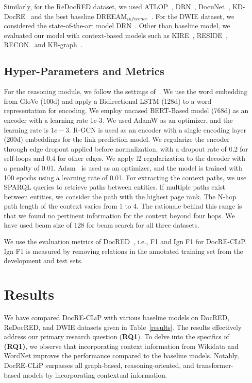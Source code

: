 \documentclass[letterpaper]{article} %
\begin{document}
Similarly, for the ReDocRED dataset, we used
ATLOP~\cite{DBLP:conf/aaai/Zhou0M021},
DRN~\cite{xu-etal-2021-discriminative},
DocuNet~\cite{ijcai2021p551},
KD-DocRE~\cite{tan-etal-2022-document} and the best baseline
DREEAM$_{inference}$~\cite{DBLP:conf/eacl/MaWO23}. For the DWIE dataset, we considered the state-of-the-art model
DRN~\cite{xu-etal-2021-discriminative}. Other than baseline model, we evaluated our model with context-based models such as KIRE~\cite{DBLP:conf/semweb/WangWSH22}, RESIDE~\cite{vashishth-etal-2018-reside}, RECON~\cite{DBLP:conf/www/BastosN0MSHK21} and KB-graph~\cite{DBLP:conf/acl/VerlindenZDDD21}.

\subsection{Hyper-Parameters and Metrics}
For the reasoning module, we follow the settings of~\cite{xu-etal-2021-discriminative}. We use the word embedding from GloVe (100d) and apply a Bidirectional LSTM (128d) to a word representation for encoding.
We employ uncased BERT-Based model (768d) as an encoder with a learning rate 1e-3. We used AdamW as an optimizer, and the learning rate is $1e-3$.
R-GCN is used as an encoder with a single encoding layer (200d) embeddings for the link prediction model. We regularize the encoder through edge dropout applied before normalization, with a dropout rate of 0.2 for self-loops and 0.4 for other edges. We apply l2 regularization to the decoder with a penalty of 0.01. Adam~\cite{DBLP:journals/corr/KingmaB14} is used as an optimizer, and the model is trained with 100 epochs using a learning rate of 0.01. For extracting the context paths, we use SPARQL queries to retrieve paths between entities. If multiple paths exist between entities, we consider the path with the highest page rank. The N-hop path length of the context varies from 1 to 4. The rationale behind this range is that we found no pertinent information for the context beyond four hops. We have used beam size of 128 for beam search for all three datasets.

We use the evaluation metrics of DocRED~\cite{yao-etal-2019-docred}, i.e., F1 and Ign F1 for DocRE-CLiP. Ign F1 is measured by removing relations in the annotated training set from the development and test sets.





\section{Results}
We have compared DocRE-CLiP with various baseline models on DocRED, ReDocRED, and DWIE datasets given in Table~\ref{results}. The results effectively address our primary research question (\textbf{RQ1}). To delve into the specifics of \textbf{(RQ1)}, we observe that incorporating context information from Wikidata and WordNet improves the performance compared to the baseline models. Notably, DocRE-CLiP surpasses all graph-based, reasoning-oriented, and transformer-based models by incorporating contextual information.
\end{document}
